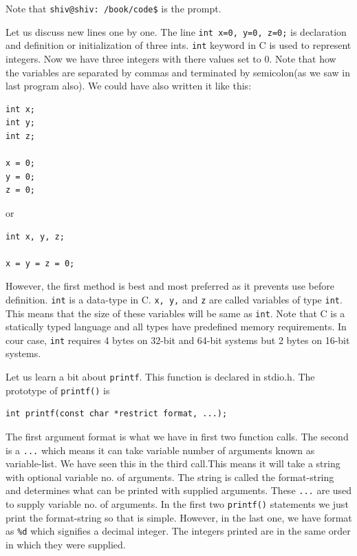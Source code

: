 Note that \texttt{shiv@shiv:~/book/code\$} is the prompt.

Let us discuss new lines one by one. The line \texttt{int x=0, y=0, z=0;} is
declaration and definition or initialization of three ints. \texttt{int}
keyword in C is used to represent integers. Now we have three integers with
there values set to 0. Note that how the variables are separated by commas and
terminated by semicolon(as we saw in last program also). We could have also
written it like this:

\begin{Verbatim}[frame=single]
int x;
int y;
int z;

x = 0;
y = 0;
z = 0;
\end{Verbatim}

or

\begin{Verbatim}[frame=single]
int x, y, z;

x = y = z = 0;
\end{Verbatim}

However, the first method is best and most preferred as it prevents use before
definition. \texttt{int} is a data-type in C. \texttt{x, y,} and \texttt{z} are
called variables of type \texttt{int}. This means that the size of these
variables will be same as \texttt{int}. Note that 
C is a statically typed language and all types have predefined memory
requirements. In cour case, \texttt{int} requires 4 bytes on 32-bit and 64-bit
systems but 2 bytes on 16-bit systems.

Let us learn a bit about \texttt{printf}. This function is declared in
stdio.h. The prototype of \texttt{printf()} is

\begin{Verbatim}[frame=single]
int printf(const char *restrict format, ...);
\end{Verbatim}

The first argument format is what we have in first two function calls. The
second is a \texttt{...} which means it can take variable number of arguments
known as variable-list. We have seen this in the third call.This means it will
take a string with optional variable no. of arguments. The string is called the
format-string and determines what can be printed with supplied arguments. These
\texttt{...} are used to supply variable no. of arguments. In the first two
\texttt{printf()} statements we just print the format-string so that is
simple. However, in the last one, we have format as \texttt{\%d} which
signifies a decimal integer. The integers printed are in the same order in
which they were supplied.

